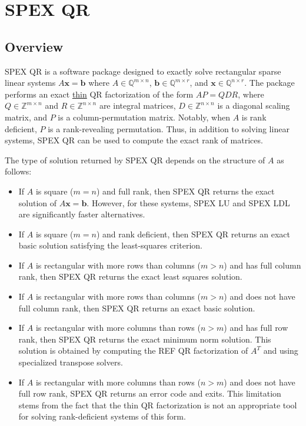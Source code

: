 \documentclass[12pt,oneside]{book}
\theoremstyle{definition}
\renewcommand{\b}{\mathbf{b}}
\newcommand{\x}{\mathbf{x}}
\begin{document}
\chapter{SPEX QR}\vspace{-0.75in}\label{ch:QR}

\section{Overview}\label{s:QR:intro}
SPEX QR is a software package designed to exactly solve rectangular sparse linear systems $A \x = \b$ where $A \in \mathbb{Q}^{m \times n}$, $\mathbf{b} \in \mathbb{Q}^{m \times r}$, and $\x \in \mathbb{Q}^{n \times r}$. The package performs an exact \underline{thin} QR factorization of the form $AP = QDR$, where $Q \in \mathbb{Z}^{m \times n}$ and $R \in \mathbb{Z}^{n \times n}$ are integral matrices, $D \in \mathbb{Z}^{n \times n}$ is a diagonal scaling matrix, and $P$ is a column-permutation matrix. Notably, when $A$ is rank deficient, $P$ is a rank-revealing permutation. Thus, in addition to solving linear systems, SPEX QR can be used to compute the exact rank of matrices.

The type of solution returned by SPEX QR depends on the structure of $A$ as follows:
\begin{itemize}
\item 
    If $A$ is square ($m = n$) and full rank, then SPEX QR returns the exact solution of $A \x = \b$. However, for these systems, SPEX
    LU and SPEX LDL are significantly faster alternatives.
\item 
    If $A$ is square ($m = n$) and rank deficient, then SPEX QR returns an exact basic solution satisfying the least-squares criterion.
\item 
    If $A$ is rectangular with more rows than columns ($m > n$) and has full column rank, then SPEX QR returns the exact least squares solution.

\item 
    If $A$ is rectangular with more rows than columns ($m > n$) and does not have full column rank, then SPEX QR returns an exact basic solution.    
\item 
    If $A$ is rectangular with more columns than rows ($n > m$) and has full row rank, then SPEX QR returns the exact minimum norm solution. This solution is obtained by computing the REF QR factorization of $A^T$ and using specialized transpose solvers.
\item
    If $A$ is rectangular with more columns than rows ($n > m$) and does not have full row rank, SPEX QR returns an error code and exits. This limitation stems from the fact that the thin QR factorization is not an appropriate tool for solving rank-deficient systems of this form.
\end{itemize}
\end{document}
